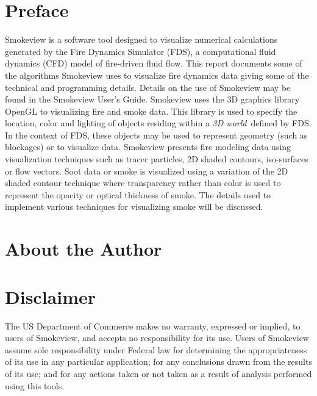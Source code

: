 \documentclass[11pt,twoside]{book}
\begin{document}
\chapter{Preface}
Smokeview is a software tool designed to visualize numerical
calculations generated by the Fire Dynamics Simulator (FDS), a
computational fluid dynamics (CFD) model of fire-driven fluid
flow. This report documents some of the algorithms Smokeview uses
to visualize fire dynamics data giving some of the technical and
programming details. Details on the use of Smokeview may be found
in the Smokeview User's Guide. Smokeview uses the 3D graphics
library OpenGL to visualizing fire and smoke data. This library is
used to specify the location, color and lighting of objects
residing within a {\em 3D world}\ defined by FDS. In the context
of FDS, these objects may be used to represent geometry (such as
blockages) or to visualize data. Smokeview presents fire modeling
data using visualization techniques such as tracer particles, 2D
shaded contours, iso-surfaces or flow vectors.  Soot data or smoke
is visualized using a variation of the 2D shaded contour technique
where transparency rather than color is used to represent the
opacity or optical thickness of smoke.  The details used to
implement various techniques for visualizing smoke will be
discussed.


\chapter{About the Author}

\begin{description}
\gforneybio
\end{description}

%
%

\chapter{Disclaimer}

The US Department of Commerce makes no warranty, expressed or
implied, to users of Smokeview, and accepts no responsibility for
its use. Users of Smokeview assume sole responsibility under
Federal law for determining the appropriateness of its use in any
particular application; for any conclusions drawn from the results
of its use; and for any actions taken or not taken as a result of
analysis performed using this tools.
\end{document}
